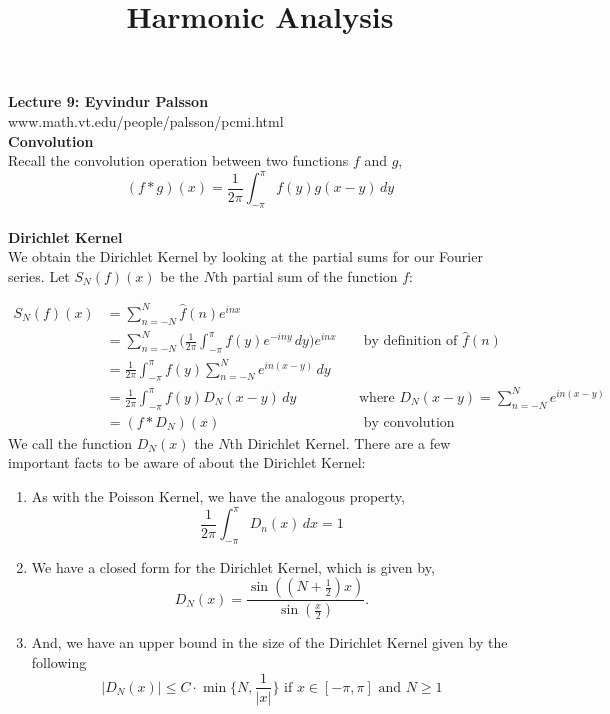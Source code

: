 \documentclass[12pt]{article}
\title{Harmonic Analysis}
\begin{document}
\noindent \textbf{Lecture 9: Eyvindur Palsson} \\
\noindent www.math.vt.edu/people/palsson/pcmi.html \\

\noindent \textbf{Convolution} \\
\noindent Recall the convolution operation between two functions $f$ and $g$, 
$$(f * g)(x) = \frac{1}{2\pi} \int^\pi_{-\pi} f(y)g(x-y)\, dy$$ \\

\noindent \textbf{Dirichlet Kernel} \\
We obtain the Dirichlet Kernel by looking at the partial sums for our Fourier series. Let $S_N(f)(x)$ be the $N$th partial sum of the function $f$:

\begin{align*}
S_N(f)(x) &= \sum^N_{n=-N} \hat{f}(n)e^{inx} \\
&= \sum^N_{n=-N} \Big(\frac{1}{2\pi} \int^{\pi}_{-\pi} f(y) e^{-iny} \,dy\Big) e^{inx} && \text{ by definition of } \hat{f}(n) \\
&= \frac{1}{2\pi} \int^{\pi}_{-\pi} f(y) \sum^N_{n=-N} e^{in(x-y)} \, dy \\
&= \frac{1}{2\pi} \int^{\pi}_{-\pi} f(y) D_N(x-y) \, dy &&\text{where } D_N(x-y)= \sum^N_{n=-N} e^{in(x-y)} \\
&= (f * D_N)(x) && \text{ by convolution}
\end{align*} 
We call the function $D_N(x)$ the $N$th Dirichlet Kernel. There are a few important facts to be aware of about the Dirichlet Kernel:
\begin{enumerate}[itemsep=0pt, topsep=0pt, parsep=0pt, partopsep=0pt] 
\item As with the Poisson Kernel, we have the analogous property, 
$$ \frac{1}{2\pi} \int^{\pi}_{-\pi} D_n(x) \, dx = 1$$
\item We have a closed form for the Dirichlet Kernel, which is given by,
$$D_N(x) = \frac{\sin ((N+\frac{1}{2})x)}{\sin(\frac{x}{2})}.$$
\item And, we have an upper bound in the size of the Dirichlet Kernel given by the following
$$\vert D_N(x) \vert \leq C \cdot \min \Big\{ N, \frac{1}{\vert x \vert}\Big\} \text{ if } x\in [-\pi, \pi] \text{ and } N\geq 1$$
\end{enumerate}
\end{document}
